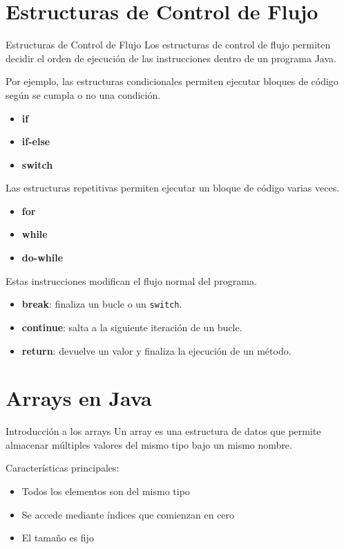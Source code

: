 \documentclass{beamer}
\begin{document}
\section{Estructuras de Control de Flujo}
\begin{frame}{Estructuras de Control de Flujo}
Los estructuras de control de flujo permiten decidir el orden de ejecución de las instrucciones dentro de un programa Java.


Por ejemplo, las estructuras condicionales permiten ejecutar bloques de código según se cumpla o no una condición.
\begin{itemize}
    \item \textbf{if}
    \item \textbf{if-else}
    \item \textbf{switch}
\end{itemize}

Las estructuras repetitivas permiten ejecutar un bloque de código varias veces.
\begin{itemize}
    \item \textbf{for}
    \item \textbf{while}
    \item \textbf{do-while}
\end{itemize}
\end{frame}

\begin{frame}
Estas instrucciones modifican el flujo normal del programa.
\begin{itemize}
    \item \textbf{break}: finaliza un bucle o un \texttt{switch}.
    \item \textbf{continue}: salta a la siguiente iteración de un bucle.
    \item \textbf{return}: devuelve un valor y finaliza la ejecución de un método.
\end{itemize}
\end{frame}

\section{Arrays en Java}
\begin{frame}{Introducción a los arrays}
Un array es una estructura de datos que permite almacenar múltiples valores del mismo tipo bajo un mismo nombre.

Características principales:
\begin{itemize}
    \item Todos los elementos son del mismo tipo
    \item Se accede mediante índices que comienzan en cero
    \item El tamaño es fijo
\end{itemize}

\end{frame}
\end{document}
